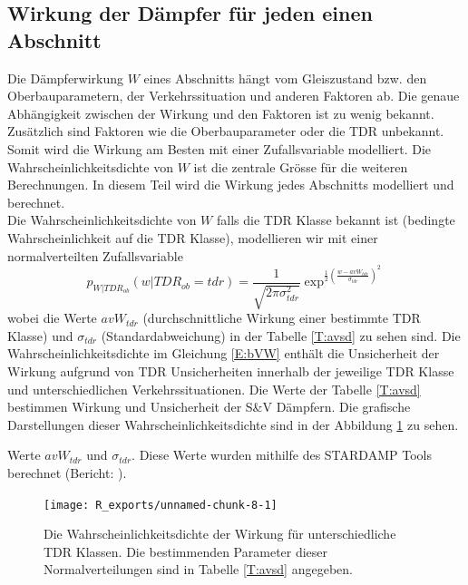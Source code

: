 \subsection{Wirkung der Dämpfer für jeden einen Abschnitt}
Die Dämpferwirkung $W$ eines Abschnitts hängt vom Gleiszustand bzw. den Oberbauparametern, der Verkehrssituation und anderen Faktoren ab. Die genaue Abhängigkeit zwischen der Wirkung und den Faktoren ist zu wenig bekannt. Zusätzlich sind Faktoren wie die Oberbauparameter oder die TDR unbekannt. Somit wird die Wirkung am Besten mit einer Zufallsvariable modelliert. Die  Wahrscheinlichkeitsdichte von $W$ ist die zentrale Grösse für die weiteren Berechnungen. In diesem Teil wird die Wirkung jedes Abschnitts modelliert und berechnet.\\

Die  Wahrscheinlichkeitsdichte von $W$ falls die TDR Klasse bekannt ist (bedingte Wahrscheinlichkeit auf die TDR Klasse), modellieren wir mit einer normalverteilten Zufallsvariable
\begin{equation}\label{E:bVW}
	p_{W|TDR_{ob}}(w|TDR_{ob}=tdr)=\frac{1}{\sqrt{2\pi\sigma_{tdr}^2}} \exp^{\frac{1}{2}\left(\frac{w-avW_{tdr}}{\sigma_{tdr}}\right)^2}
\end{equation}
wobei die Werte $avW_{tdr}$ (durchschnittliche Wirkung einer bestimmte TDR Klasse) und $\sigma_{tdr}$ (Standardabweichung) in der Tabelle \ref{T:avsd} zu sehen sind. Die Wahrscheinlichkeitsdichte im Gleichung \ref{E:bVW} enthält die Unsicherheit der Wirkung aufgrund von TDR Unsicherheiten innerhalb der jeweilige TDR Klasse und unterschiedlichen Verkehrssituationen. Die Werte der Tabelle \ref{T:avsd} bestimmen Wirkung und Unsicherheit der S\&V Dämpfern. Die grafische Darstellungen dieser Wahrscheinlichkeitsdichte sind in der Abbildung \ref{F:pWk} zu sehen.\\

\begin{table}[!htb]
	\begin{center}
	
	\caption{Werte $avW_{tdr}$ und $\sigma_{tdr}$. Diese Werte wurden mithilfe des STARDAMP Tools berechnet (Bericht: \citeauthor{sbbWCalc} ).}
	\label{T:avsd}
	\end{center}
\end{table}

\begin{figure}[!htb]
	\centering
\begin{knitrout}
\color{fgcolor}
\texttt{[image: R\_exports/unnamed-chunk-8-1]} 

\end{knitrout}
	\caption{ Die Wahrscheinlichkeitsdichte der Wirkung für unterschiedliche TDR Klassen. Die bestimmenden Parameter dieser Normalverteilungen sind in Tabelle \ref{T:avsd} angegeben. }
	\label{F:pWk}
\end{figure}

